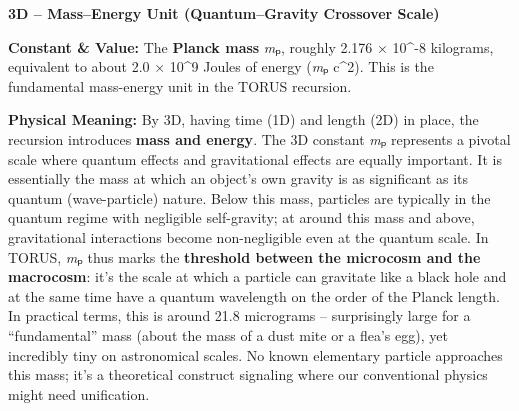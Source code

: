 \documentclass[
]{article}
\begin{document}
\textbf{3D -- Mass--Energy Unit (Quantum--Gravity Crossover Scale)}

\textbf{Constant \& Value:} The \textbf{Planck mass} \emph{m}ₚ, roughly
2.176 × 10\^{}-8 kilograms\hspace{0pt}, equivalent to about 2.0 ×
10\^{}9 Joules of energy (\emph{m}ₚ c\^{}2). This is the fundamental
mass-energy unit in the TORUS recursion.

\textbf{Physical Meaning:} By 3D, having time (1D) and length (2D) in
place, the recursion introduces \textbf{mass and energy}. The 3D
constant \emph{m}ₚ represents a pivotal scale where quantum effects and
gravitational effects are equally important. It is essentially the mass
at which an object's own gravity is as significant as its quantum
(wave-particle) nature\hspace{0pt}. Below this mass, particles are
typically in the quantum regime with negligible self-gravity; at around
this mass and above, gravitational interactions become non-negligible
even at the quantum scale. In TORUS, \emph{m}ₚ thus marks the
\textbf{threshold between the microcosm and the macrocosm}\hspace{0pt}:
it's the scale at which a particle can gravitate like a black hole and
at the same time have a quantum wavelength on the order of the Planck
length. In practical terms, this is around 21.8 micrograms --
surprisingly large for a ``fundamental'' mass (about the mass of a dust
mite or a flea's egg), yet incredibly tiny on astronomical
scales\hspace{0pt}. No known elementary particle approaches this mass;
it's a theoretical construct signaling where our conventional physics
might need unification.
\end{document}
